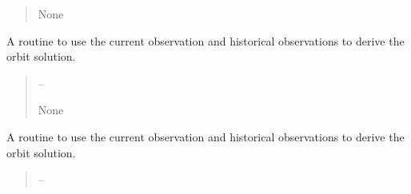 \documentclass[letterpaper,11pt,english]{sphinxmanual}
\begin{document}
\begin{savenotes}
\begin{fulllineitems}
\begin{savenotes}
\begin{fulllineitems}
\begin{quote}
\begin{description}
\sphinxAtStartPar
None

\end{description}\end{quote}

\end{fulllineitems}\end{savenotes}


\begin{savenotes}\begin{fulllineitems}
\label{\detokenize{code/opihiexarata.gui.manual:opihiexarata.gui.manual.OpihiManualWindow.__connect_push_button_orbit_solve_ephemeris}}
\pysigstartsignatures
{}
\pysigstopsignatures
\sphinxAtStartPar
A routine to use the current observation and historical observations
to derive the orbit solution.
\begin{quote}\begin{description}
\sphinxAtStartPar
{} – 

\sphinxAtStartPar
None

\end{description}\end{quote}

\end{fulllineitems}\end{savenotes}


\begin{savenotes}\begin{fulllineitems}
\label{\detokenize{code/opihiexarata.gui.manual:opihiexarata.gui.manual.OpihiManualWindow.__connect_push_button_orbit_solve_orbit}}
\pysigstartsignatures
{}
\pysigstopsignatures
\sphinxAtStartPar
A routine to use the current observation and historical observations
to derive the orbit solution.
\begin{quote}\begin{description}
\sphinxAtStartPar
{} – 


\end{description}
\end{quote}
\end{fulllineitems}
\end{savenotes}
\end{fulllineitems}
\end{savenotes}
\end{document}
